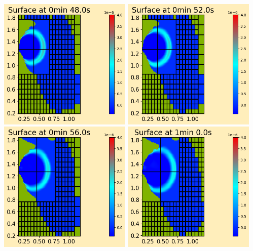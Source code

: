 \documentclass[11pt]{article}
\begin{document}
\vskip 10pt 
\includegraphics[width=0.475\textwidth]{frame0012fig0.png}
\vskip 10pt 
\includegraphics[width=0.475\textwidth]{frame0013fig0.png}
\vskip 10pt 
\includegraphics[width=0.475\textwidth]{frame0014fig0.png}
\vskip 10pt 
\includegraphics[width=0.475\textwidth]{frame0015fig0.png}
\end{document}
